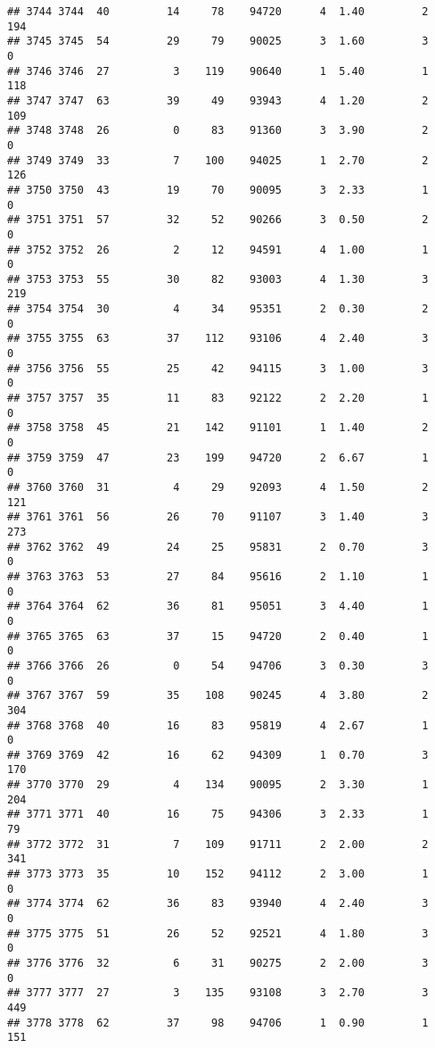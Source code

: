 \documentclass[
]{article}
\begin{document}
\begin{verbatim}
## 3744 3744  40         14     78    94720      4  1.40         2      194
## 3745 3745  54         29     79    90025      3  1.60         3        0
## 3746 3746  27          3    119    90640      1  5.40         1      118
## 3747 3747  63         39     49    93943      4  1.20         2      109
## 3748 3748  26          0     83    91360      3  3.90         2        0
## 3749 3749  33          7    100    94025      1  2.70         2      126
## 3750 3750  43         19     70    90095      3  2.33         1        0
## 3751 3751  57         32     52    90266      3  0.50         2        0
## 3752 3752  26          2     12    94591      4  1.00         1        0
## 3753 3753  55         30     82    93003      4  1.30         3      219
## 3754 3754  30          4     34    95351      2  0.30         2        0
## 3755 3755  63         37    112    93106      4  2.40         3        0
## 3756 3756  55         25     42    94115      3  1.00         3        0
## 3757 3757  35         11     83    92122      2  2.20         1        0
## 3758 3758  45         21    142    91101      1  1.40         2        0
## 3759 3759  47         23    199    94720      2  6.67         1        0
## 3760 3760  31          4     29    92093      4  1.50         2      121
## 3761 3761  56         26     70    91107      3  1.40         3      273
## 3762 3762  49         24     25    95831      2  0.70         3        0
## 3763 3763  53         27     84    95616      2  1.10         1        0
## 3764 3764  62         36     81    95051      3  4.40         1        0
## 3765 3765  63         37     15    94720      2  0.40         1        0
## 3766 3766  26          0     54    94706      3  0.30         3        0
## 3767 3767  59         35    108    90245      4  3.80         2      304
## 3768 3768  40         16     83    95819      4  2.67         1        0
## 3769 3769  42         16     62    94309      1  0.70         3      170
## 3770 3770  29          4    134    90095      2  3.30         1      204
## 3771 3771  40         16     75    94306      3  2.33         1       79
## 3772 3772  31          7    109    91711      2  2.00         2      341
## 3773 3773  35         10    152    94112      2  3.00         1        0
## 3774 3774  62         36     83    93940      4  2.40         3        0
## 3775 3775  51         26     52    92521      4  1.80         3        0
## 3776 3776  32          6     31    90275      2  2.00         3        0
## 3777 3777  27          3    135    93108      3  2.70         3      449
## 3778 3778  62         37     98    94706      1  0.90         1      151

\end{verbatim}
\end{document}
